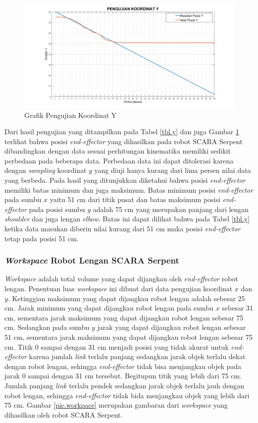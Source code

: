 \begin{figure}[H]
	\centering
	\includegraphics[width=13cm]{gambar/py.png}
	\caption{Grafik Pengujian Koordinat Y}
	\label{pic.koordinaty}
\end{figure}


Dari hasil pengujian yang ditampilkan pada Tabel \ref{tbl.y} dan juga Gambar \ref{pic.koordinaty} terlihat bahwa posisi \textit{end-effector} yang dihasilkan pada robot SCARA Serpent dibandingkan dengan data sesuai perhitungan kinematika memiliki sedikit perbedaan pada beberapa data. Perbedaan data ini dapat ditolerasi karena dengan \textit{sampling} koordinat $y$ yang diuji hanya kurang dari lima persen nilai data yang berbeda. Pada hasil yang ditunjukkan diketahui bahwa posisi \textit{end-effector} memiliki batas minimum dan juga maksimum. Batas minimum posisi \textit{end-effector} pada sumbu $x$ yaitu 51 cm dari titik pusat dan batas maksimum posisi \textit{end-effector} pada posisi sumbu $y$ adalah 75 cm yang merupakan panjang dari lengan \textit{shoulder} dan juga lengan \textit{elbow}.  Batas ini dapat dilihat bahwa pada Tabel \ref{tbl.y} ketika data masukan diberin nilai kurang dari 51 cm maka posisi \textit{end-effector} tetap pada posisi 51 cm.
\subsubsection{\textit{Workspace} Robot Lengan SCARA Serpent }
\textit{Workspace} adalah total volume yang dapat dijangkau oleh \textit{end-effector} robot lengan. Penentuan luas \textit{workspace} ini dibuat dari data pengujian koordinat $x$ dan $y$. Ketinggian maksimum yang dapat dijangkau robot lengan adalah sebesar 25 cm. Jarak minimum yang dapat dijangkau robot lengan pada sumbu $x$ sebesar 31 cm, sementara jarak maksimum yang dapat dijangkau robot lengan sebesar 75 cm. Sedangkan pada sumbu $y$ jarak yang dapat dijangkau robot lengan sebesar 51 cm, sementara jarak maksimum yang dapat dijangkau robot lengan sebesar 75 cm. Titik 0 sampai dengan 31 cm menjadi posisi yang tidak akurat untuk \textit{end-effector} karena jumlah \textit{link} terlalu panjang sedangkan jarak objek terlalu dekat dengan robot lengan, sehingga \textit{end-effector} tidak bisa menjangkau objek pada jarak 0 sampai dengan 31 cm tersebut. Begitupun titik yang lebih dari 75 cm. Jumlah panjang \textit{link} terlalu pendek sedangkan jarak objek terlalu jauh dengan robot lengan, sehingga \textit{end-effector} tidak bida menjangkau objek yang lebih dari 75 cm. Gambar \ref{pic.workpace} merupakan gambaran dari \textit{workspace} yang dihasilkan oleh robot SCARA Serpent.



